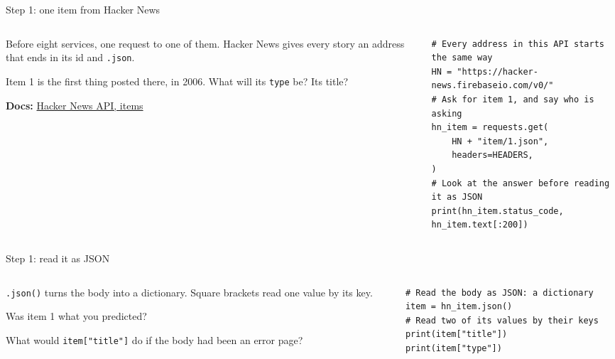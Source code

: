\documentclass[9pt,aspectratio=169]{beamer}
\begin{document}
\begin{frame}[fragile]{Step 1: one item from Hacker News}
    \begin{columns}[T]
        \begin{column}{0.37\textwidth}
            Before eight services, one request to one of them. Hacker News gives every story an address that ends in its id and \texttt{.json}.

            \medskip
            Item 1 is the first thing posted there, in 2006. What will its \texttt{type} be? Its title?

            \medskip
            {\scriptsize\textbf{Docs:} \href{https://github.com/HackerNews/API\#items}{Hacker News API, items}\par}
        \end{column}
        \begin{column}{0.6\textwidth}
\begin{lstlisting}[basicstyle=\ttfamily\footnotesize]
# Every address in this API starts the same way
HN = "https://hacker-news.firebaseio.com/v0/"
# Ask for item 1, and say who is asking
hn_item = requests.get(
    HN + "item/1.json",
    headers=HEADERS,
)
# Look at the answer before reading it as JSON
print(hn_item.status_code, hn_item.text[:200])
\end{lstlisting}
        \end{column}
    \end{columns}
\end{frame}

\begin{frame}[fragile]{Step 1: read it as JSON}
    \begin{columns}[T]
        \begin{column}{0.37\textwidth}
            \texttt{.json()} turns the body into a dictionary. Square brackets read one value by its key.

            \medskip
            Was item 1 what you predicted?

            \medskip
            What would \texttt{item["title"]} do if the body had been an error page?
        \end{column}
        \begin{column}{0.6\textwidth}
\begin{lstlisting}[basicstyle=\ttfamily\footnotesize]
# Read the body as JSON: a dictionary
item = hn_item.json()
# Read two of its values by their keys
print(item["title"])
print(item["type"])
\end{lstlisting}
        \end{column}
    \end{columns}
\end{frame}
\end{document}
